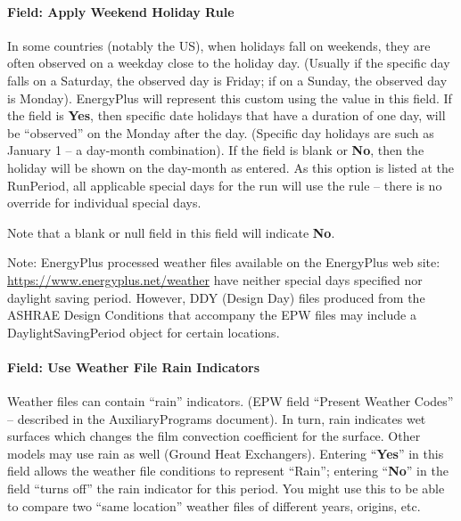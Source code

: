 \paragraph{Field: Apply Weekend Holiday Rule}\label{field-apply-weekend-holiday-rule-1}

In some countries (notably the US), when holidays fall on weekends, they are often observed on a weekday
close to the holiday day. (Usually if the specific day falls on a Saturday, the observed day is Friday;
if on a Sunday, the observed day is Monday). EnergyPlus will represent this custom using the value in
this field. If the field is \textbf{Yes}, then specific date holidays that have a duration of one day,
will be ``observed'' on the Monday after the day. (Specific day holidays are such as January 1 -- a
day-month combination). If the field is blank or \textbf{No}, then the holiday will be shown on the
day-month as entered. As this option is listed at the RunPeriod, all applicable special days for the run
will use the rule -- there is no override for individual special days.

Note that a blank or null field in this field will indicate \textbf{No}.

\begin{callout}
Note: EnergyPlus processed weather files available on the EnergyPlus web site: \url{https://www.energyplus.net/weather}
have neither special days specified nor daylight saving period. However, DDY (Design Day) files produced
from the ASHRAE Design Conditions that accompany the EPW files may include a DaylightSavingPeriod object
for certain locations.
\end{callout}

\paragraph{Field: Use Weather File Rain Indicators}\label{field-use-weather-file-rain-indicators-1}

Weather files can contain ``rain'' indicators. (EPW field ``Present Weather Codes'' -- described in the
AuxiliaryPrograms document). In turn, rain indicates wet surfaces which changes the film convection
coefficient for the surface. Other models may use rain as well (Ground Heat Exchangers). Entering
``\textbf{Yes}'' in this field allows the weather file conditions to represent ``Rain''; entering
``\textbf{No}'' in the field ``turns off'' the rain indicator for this period. You might use this
to be able to compare two ``same location'' weather files of different years, origins, etc.


